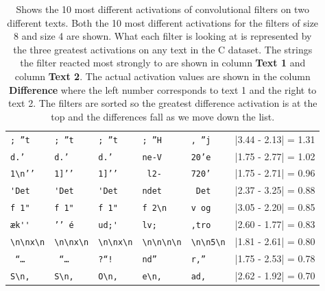 \begin{table}
\begin{tabular}{lll|lll}
        \verb[; ”t[       & \verb[; ”t[       & \verb[; ”t[          &
        \verb'; ”H'       & \verb', ”j'       & |3.44 - 2.13| = 1.31 \\

        \verb[d.’ [       & \verb[d.’ [       & \verb[d.’ [          &
        \verb'ne-V'       & \verb'20’e'       & |1.75 - 2.77| = 1.02 \\

        \verb[1\n’’[      & \verb[1]’’[       & \verb[1]’’[          &
        \verb' l2-'       & \verb'720’'       & |1.75 - 2.71| = 0.96 \\

        \verb['Det[       & \verb['Det[       & \verb['Det[          &
        \verb'ndet'       & \verb' Det'       & |2.37 - 3.25| = 0.88 \\

        \verb[f 1"[       & \verb[f 1"[       & \verb[f 1"[          &
        \verb'f 2\n'      & \verb'v og'       & |3.05 - 2.20| = 0.85 \\

        \verb[æk''[       & \verb[’’ é[       & \verb[ud;'[          &
        \verb'lv; '       & \verb',tro'       & |2.60 - 1.77| = 0.83 \\

        \verb[\n\nx\n[    & \verb[\n\nx\n[    & \verb[\n\nx\n[       &
        \verb'\n\n\n\n'   & \verb'\n\n5\n'    & |1.81 - 2.61| = 0.80 \\
        \verb[ “… [       & \verb[ “… [       & \verb[?“! [          &
        \verb'nd” '       & \verb'r,” '       & |1.75 - 2.53| = 0.78 \\

        \verb[S\n, [      & \verb[S\n, [      & \verb[O\n, [         &
        \verb'e\n, '      & \verb'ad, '       & |2.62 - 1.92| = 0.70 \\
    \end{tabular}

    \caption{Shows the 10 most different activations of convolutional filters
    on two different texts. Both the 10 most different activations for the
    filters of size 8 and size 4 are shown. What each filter is looking at is
    represented by the three greatest activations on any text in the \gls{C}
    dataset. The strings the filter reacted most strongly to are shown in column
    \textbf{Text 1} and column \textbf{Text 2}. The actual activation values
    are shown in the column \textbf{Difference} where the left number corresponds
    to text 1 and the right to text 2. The filters are sorted so the
    greatest difference activation is at the top and the differences fall as we
    move down the list.}

    \label{tab:teacher_feedback_output}
\end{table}

